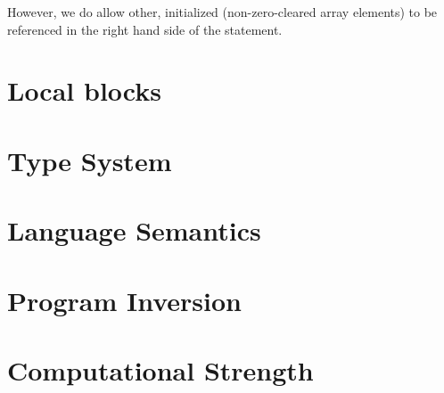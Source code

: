 However, we do allow other, initialized (non-zero-cleared array elements) to be referenced in the right hand side of the statement.

\section{Local blocks}

\section{Type System}
\label{sec:type-system}

\section{Language Semantics}
\label{sec:language-semantics}

\section{Program Inversion}
\label{sec:program-inversion}

\section{Computational Strength}
\label{sec:computational-strength}
